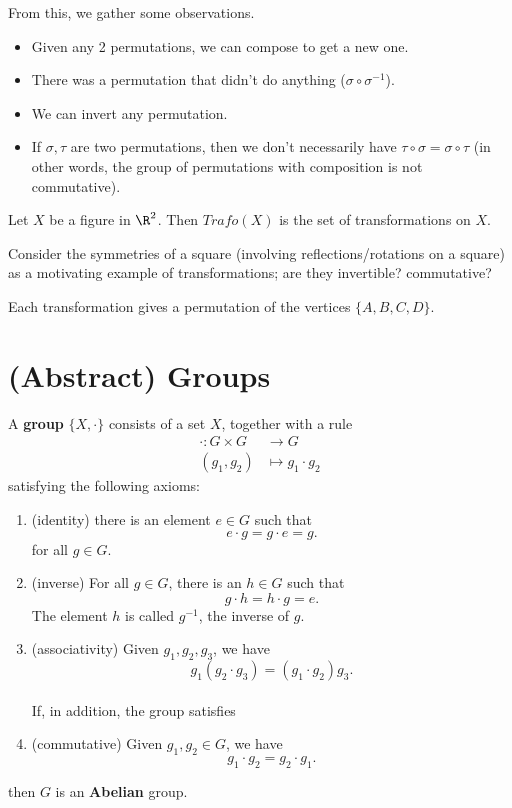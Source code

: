 \documentclass[math1530-lecture-notes]{subfiles}
\begin{document}
From this, we gather some observations.
\begin{itemize}
  \item Given any 2 permutations, we can compose to get a new one.
  \item There was a permutation that didn't do anything ($\sigma\circ \sigma^{-1}$).
  \item We can invert any permutation.
  \item If $\sigma,\tau$ are two permutations, then we don't necessarily have $\tau\circ
    \sigma=\sigma\circ \tau$ (in other words, the group of permutations with composition is not
    commutative).
\end{itemize}

\begin{definition}[Transformations]{}
  Let $X$ be a figure in $\R^2$. Then $Trafo(X)$ is the set of transformations on $X$.
\end{definition}

Consider the symmetries of a square (involving reflections/rotations on a square) as a motivating
example of transformations; are they invertible? commutative?

\begin{remark}
  Each transformation gives a permutation of the vertices $\{A,B,C,D\} $.
\end{remark}


\section{(Abstract) Groups}
\begin{definition}[Groups]{}
  A \textbf{group} $\{X, \cdot \}$ consists of a set $X$, together with a rule 
  \begin{align*}
    \cdot : G\times G &\to G\\
    (g_1,g_2) &\mapsto g_1\cdot g_2
  \end{align*}
  satisfying the following axioms:
  \begin{enumerate}
    \item (identity) there is an element $e\in G$ such that \[
        e\cdot g=g\cdot e=g
      .\] for all $g\in G$.
    \item (inverse) For all $g\in G$, there is an $h\in G$ such that \[
      g\cdot h=h\cdot g=e
      .\] The element $h$ is called $g^{-1}$, the inverse of $g$.
    \item (associativity) Given $ g_1, g_2, g_3$, we have \[
        g_1(g_2\cdot g_3) = (g_1\cdot g_2)g_3
    .\] \\
    If, in addition, the group satisfies
  \item (commutative) Given $ g_1,g_2\in G$, we have \[
    g_1\cdot g_2=g_2\cdot g_1
  .\] 
  \end{enumerate}
  then $G$ is an \textbf{Abelian} group.
\end{definition}
\end{document}
